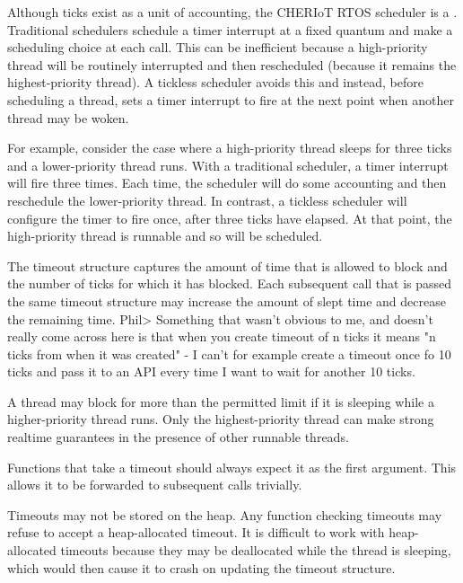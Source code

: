 Although ticks exist as a unit of accounting, the CHERIoT RTOS scheduler is a .
Traditional schedulers schedule a timer interrupt at a fixed quantum and make a scheduling choice at each call.
This can be inefficient because a high-priority thread will be routinely interrupted and then rescheduled (because it remains the highest-priority thread).
A tickless scheduler avoids this and instead, before scheduling a thread, sets a timer interrupt to fire at the next point when another thread may be woken.

For example, consider the case where a high-priority thread sleeps for three ticks and a lower-priority thread runs.
With a traditional scheduler, a timer interrupt will fire three times.
Each time, the scheduler will do some accounting and then reschedule the lower-priority thread.
In contrast, a tickless scheduler will configure the timer to fire once, after three ticks have elapsed.
At that point, the high-priority thread is runnable and so will be scheduled.

The timeout structure captures the amount of time that is allowed to block and the number of ticks for which it has blocked.
Each subsequent call that is passed the same timeout structure may increase the amount of slept time and decrease the remaining time.
Phil> Something that wasn't obvious to me, and doesn't really come across here is that when you create timeout of n ticks it means "n ticks from when it was created" - I can't for example create a timeout once fo 10 ticks and pass it to an API every time I want to wait for another 10 ticks. 

\begin{note}
A thread may block for more than the permitted limit if it is sleeping while a higher-priority thread runs.
Only the highest-priority thread can make strong realtime guarantees in the presence of other runnable threads.
\end{note}

Functions that take a timeout should always expect it as the first argument.
This allows it to be forwarded to subsequent calls trivially.

\begin{warning}
Timeouts may not be stored on the heap.
Any function checking timeouts may refuse to accept a heap-allocated timeout.
It is difficult to work with heap-allocated timeouts because they may be deallocated while the thread is sleeping, which would then cause it to crash on updating the timeout structure.
\end{warning}

